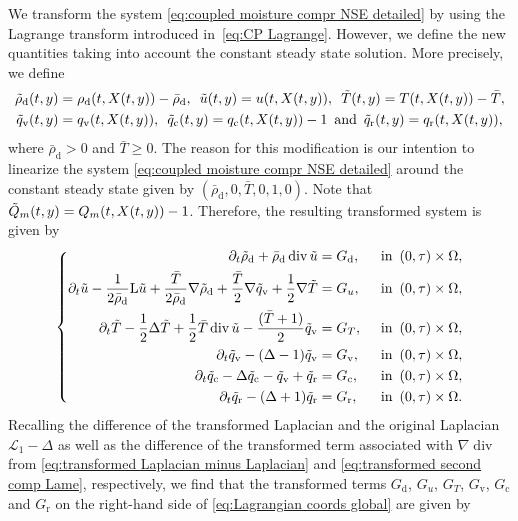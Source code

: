 \documentclass[10pt]{amsart}
\theoremstyle{plain}
\theoremstyle{definition}
\theoremstyle{thm}
\numberwithin{equation}{section}
\newcommand{\rL}{\mathrm{L}}
\newcommand{\cL}{\mathcal{L}}
\DeclareMathOperator{\mdiv}{div}
\newcommand{\del}{\partial}
\newcommand{\tand}{\enspace \text{and} \enspace}
\newcommand{\tin}{\enspace \text{in} \enspace}
\newcommand{\rd}{\mathrm{d}}
\newcommand{\rr}{\mathrm{r}}
\newcommand{\rv}{\mathrm{v}}
\newcommand{\rc}{\mathrm{c}}
\newcommand{\trho}{\Tilde{\rho}}
\newcommand{\tu}{\Tilde{u}}
\newcommand{\tT}{\Tilde{T}}
\newcommand{\tq}{\Tilde{q}}
\newcommand{\tQ}{\Tilde{Q}}
\begin{document}
We transform the system \eqref{eq:coupled moisture compr NSE detailed} by using the Lagrange transform introduced in~\eqref{eq:CP Lagrange}. 
However, we define the new quantities taking into account the constant steady state solution.
More precisely, we define
\begin{equation*}
    \begin{aligned}
        \trho_\rd(t,y)
        &= \rho_\rd(t,X(t,y))- \bar{\rho}_\rd, \enspace \tu(t,y) = u(t,X(t,y)), \enspace \tT(t,y) =T(t,X(t,y)) - \bar{T} ,\\
        \tq_\rv(t,y) &= q_\rv(t,X(t,y)), \enspace \tq_\rc(t,y) = q_\rc(t,X(t,y)) -1 \tand \tq_\rr(t,y) = q_\rr(t,X(t,y)),
    \end{aligned}
\end{equation*}
where $\bar{\rho}_\rd>0$ and $\bar{T} \geq0$. 
The reason for this modification is our intention to linearize the system \eqref{eq:coupled moisture compr NSE detailed} around the constant steady state given by $(\bar{\rho}_\rd, 0,\bar{T},0,1,0)$. 
Note that $\tQ_m(t,y) =Q_m(t,X(t,y)) -1$. 
Therefore, the resulting transformed system is given by
\begin{equation}\label{eq:Lagrangian coords global}
	\left\{	
    \begin{aligned}
        \del_t\trho_\rd+ \bar{\rho}_\rd \mdiv\tu
        &=G_\rd, &&\tin (0,\tau) \times \Omega,\\
		\del_t\tu-\frac{1}{ 2\bar{\rho}_\rd}\rL\tu + \frac{\bar{T}}{2 \bar{\rho}_\rd} \nabla \trho_\rd + \frac{\bar{T}}{2}\nabla \tq_\rv + \frac{1}{2}\nabla \tT 
        &=G_u, &&\tin (0,\tau) \times \Omega,\\
        \del_t\tT-\frac{1}{2}\Delta\tT + \frac{1}{2}\bar{T} \mdiv \tu - \frac{ (\bar{T}+1)}{2}\tq_\rv
        &=G_T, &&\tin (0,\tau) \times \Omega,\\
        \del_t\tq_\rv-(\Delta -1)\tq_\rv
        &=G_\rv, &&\tin (0,\tau) \times \Omega,\\
        \del_t\tq_\rc-\Delta\tq_\rc - \tq_\rv+\tq_\rr
        &=G_\rc, &&\tin (0,\tau) \times \Omega,\\
        \del_t\tq_\rr-(\Delta+1) \tq_\rr 
        &=G_\rr, &&\tin (0,\tau) \times \Omega.
		\end{aligned}\right.
\end{equation} 
Recalling the difference of the transformed Laplacian and the original Laplacian~$\cL_1 - \Delta$ as well as the difference of the transformed term associated with $\nabla \mdiv$ from \eqref{eq:transformed Laplacian minus Laplacian} and \eqref{eq:transformed second comp Lame}, respectively, we find that the transformed terms $G_\rd$, $G_u$, $G_T$, $G_\rv$, $G_\rc$ and $G_\rr$ on the right-hand side of \eqref{eq:Lagrangian coords global} are given by
\end{document}
